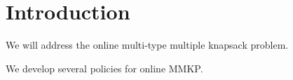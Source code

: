 




\section{Introduction}
We will address the online multi-type multiple knapsack problem. 



We develop several policies for online MMKP. 



